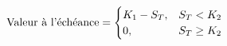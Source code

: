 \documentclass[10pt, french]{article}
\begin{document}
\begin{multicols*}{2}
\begin{definitionNOHFILLsub}[]
\begin{center}
\begin{tikzpicture}[x=0.75pt,y=0.75pt,yscale=-1,xscale=1]
\end{tikzpicture}
\end{center}
\end{definitionNOHFILLsub}

\begin{definitionNOHFILLsub}
\begin{align*}
	\shortstack{Valeur à l'échéance}
	&=	\begin{cases}
		K_{1}	-	S_{T},	&	S_{T}	<		K_{2}	\\
		0,	&	S_{T}	\geq		K_{2}	\\
		\end{cases}
\end{align*}

\begin{center}

\begin{tikzpicture}[x=0.75pt,y=0.75pt,yscale=-1,xscale=1]


\end{tikzpicture}
\end{center}
\end{definitionNOHFILLsub}
\end{multicols*}
\end{document}
